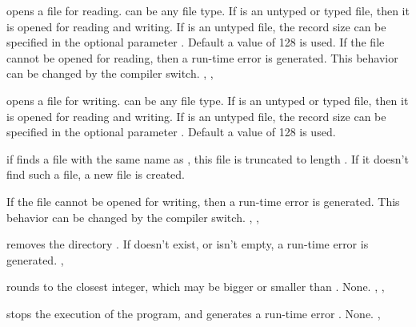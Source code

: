 \documentclass{report}
\begin{document}
\html{}

{ opens a file  for reading.  can be any file type.
If  is an untyped or typed file, then it is opened for reading and 
writing. If  is an untyped file, the record size can be specified in 
the optional parameter . Default a value of 128 is used.}
{If the file cannot be opened for reading, then a run-time error is
generated. This behavior can be changed by the  compiler switch.}
{, , }


\html{}

{ opens a file  for writing.  can be any file type.
If  is an untyped or typed file, then it is opened for reading and 
writing. If  is an untyped file, the record size can be specified in 
the optional parameter . Default a value of 128 is used.

if  finds a file with the same name as , this file is
truncated to length . If it doesn't find such a file, a new file is 
created.
}
{If the file cannot be opened for writing, then a run-time error is
generated. This behavior can be changed by the  compiler switch.}
{, , }


\html{}

{ removes the  directory .}
{If  doesn't exist, or isn't empty, a run-time error is generated.
}
{, }

\html{}

{ rounds  to the closest integer, which may be bigger or
smaller than .}
{None.}
{, , }

\html{}

{ stops the execution of the program, and generates a
run-time error .}
{None.}
{, }

\html{}
\end{document}
